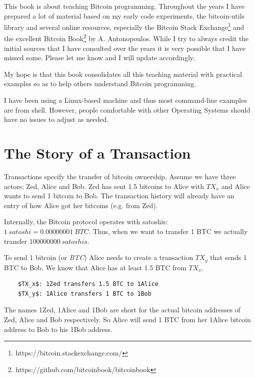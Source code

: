 This book is about teaching Bitcoin programming. Throughout the years I have prepared a lot of material based on my early code experiments, the bitcoin-utils library and several online resources, especially the Bitcoin Stack Exchange\footnote{https://bitcoin.stackexchange.com/} and the excellent Bitcoin Book\footnote{https://github.com/bitcoinbook/bitcoinbook} by A. Antonopoulos. While I try to always credit the initial sources that I have consulted over the years it is very possible that I have missed some. Please let me know and I will update accordingly.

My hope is that this book consolidates all this teaching material with practical examples so as to help others understand Bitcoin programming. 

I have been using a Linux-based machine and thus most command-line examples are from  shell. However, people comfortable with other Operating Systems should have no issues to adjust as needed.

\section{The Story of a Transaction}
Transactions specify the transfer of bitcoin ownership. Assume we have three actors; Zed, Alice and Bob. Zed has sent 1.5 bitcoins to Alice with $TX_x$ and Alice wants to send 1 bitcoin to Bob. The transaction history will already have an entry of how Alice got her bitcoins (e.g. from Zed).

\begin{remark}
Internally, the Bitcoin protocol operates with satoshis: $1~satoshi = 0.00000001~BTC$. Thus, when we want to transfer 1 BTC we actually transfer $100000000~satoshis$.
\end{remark}

To send 1 bitcoin (or \emph{BTC}) Alice needs to create a transaction $TX_y$ that sends 1 BTC to Bob. We know that Alice has at least 1.5 BTC from $TX_x$.

\begin{emphbox}
\begin{lstlisting}
    $TX_x$: 1Zed transfers 1.5 BTC to 1Alice
    $TX_y$: 1Alice transfers 1 BTC to 1Bob
\end{lstlisting}
\end{emphbox}

The names 1Zed, 1Alice and 1Bob are short for the actual bitcoin addresses of Zed, Alice and Bob respectively. So Alice will send 1 BTC from her 1Alice bitcoin address to Bob to his 1Bob address.

